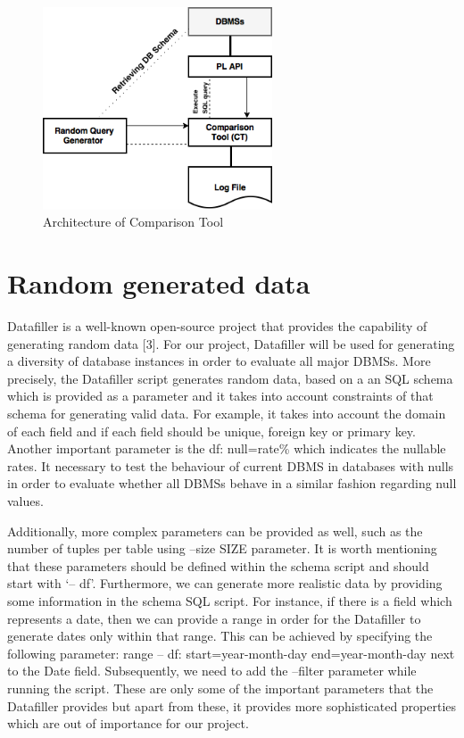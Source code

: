  \begin{figure} 
      \centering
      \includegraphics[width=\textwidth,height=6cm]{Images/3-ComparisonTool}
      \caption{Architecture of Comparison Tool}
      \label{fig:counting-methods}
  \end{figure}

\section{Random generated data}

Datafiller is a well-known open-source project that provides the capability of generating random data [3]. For our project, Datafiller will be used for generating a diversity of  database instances in order to evaluate all major DBMSs. More precisely, the Datafiller script generates random data, based on a an SQL  schema which is provided as a parameter and it takes into account constraints of that schema for generating valid data. For example, it takes into account the domain of each field and if each field should be unique, foreign key or primary key. Another important parameter is the df: null=rate\% which indicates the nullable rates. It necessary to test the behaviour of current DBMS in databases with nulls in order to evaluate whether all DBMSs behave in a similar fashion regarding null values.     

Additionally, more complex parameters can be provided as well, such as the number of tuples per table using --size SIZE parameter. It is worth mentioning that these parameters should be defined within the schema script and should start with ‘-- df’.  Furthermore, we can generate more realistic data by providing some information in the schema SQL script. For instance, if there is a field which represents a date, then we can provide a range in order for the Datafiller to generate dates only within that range. This can be achieved by specifying the following parameter: range -- df: start=year-month-day end=year-month-day next to the Date field. Subsequently, we need to add the --filter parameter while running the script. These are only some of the important parameters that the Datafiller provides but apart from these, it provides more sophisticated properties which are out of importance for our project.



